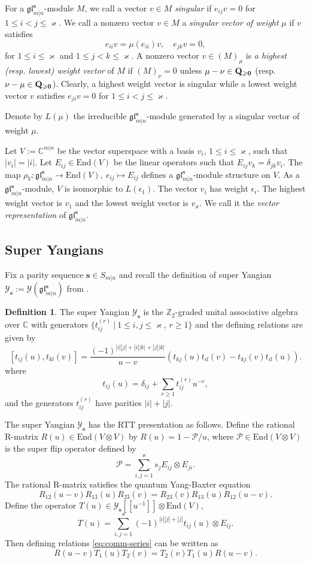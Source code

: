 \documentclass[11pt,reqno]{amsart}
\numberwithin{equation}{section}
\theoremstyle{definition}
\newtheorem{dfn}[thm]{Definition}
\theoremstyle{remark}
\newcommand{\beq}{\begin{equation}}
\newcommand{\eeq}{\end{equation}}
\newcommand{\C}{\mathbb{C}}
\newcommand{\Z}{\mathbb{Z}}
\newcommand{\mc}{\mathcal}
\newcommand{\End}{\mathrm{End}}
\newcommand{\bC}{\mathbb{C}}
\newcommand{\gge}{\geqslant}
\newcommand{\lle}{\leqslant}
\newcommand{\glMN}{\mathfrak{gl}_{m|n}^{\bm s}}
\newcommand{\YglMN}{\mathscr{Y}_{\bm s}}
\newcommand{\ka}{\varkappa}
\newcommand{\s}{{\bm s}}
\begin{document}
For a $\glMN$-module $M$, we call a vector $v\in M$ \textit{singular} if $e_{ij}v=0$ for $1\lle i<j\lle \ka$. We call a nonzero vector $v\in M$ a \textit{singular vector of weight} $\mu$ if $v$ satisfies
\[
e_{ii}v=\mu(e_{ii})v,\quad e_{jk}v=0,
\]
for $1\lle i\lle \ka$ and $1\lle j< k\lle \ka$. A nonzero vector $v\in (M)_{\mu}$ is {\it a highest (resp. lowest) weight vector} of $M$ if $(M)_{\nu}= 0$ unless $\mu-\nu\in\bf Q_{\gge 0}$ (resp. $\nu-\mu\in\bf Q_{\gge 0}$). Clearly, a highest weight vector is singular while a lowest weight vector $v$ satisfies $e_{ji}v=0$ for $1\lle i< j\lle \ka$.


Denote by $L(\mu)$ the irreducible $\glMN$-module generated by a
singular vector of weight $\mu$.


Let $V:=\bC^{m\vert n}$ be the vector superspace with a basis $v_i$, $1\lle i \lle \ka$, such that $\vert v_i\vert =\vert i\vert $. Let $E_{ij}\in\End(V)$ be the linear operators such that $E_{ij}v_k=\delta_{jk}v_i$. The map $\rho_V:\glMN\to \End(V),\ e_{ij}\mapsto E_{ij}$ defines a $\glMN$-module structure on $V$. As a $\glMN$-module, $V$ is isomorphic to $L({\epsilon_1})$. The vector $v_i$ has weight $\epsilon_i$. The highest weight vector is $v_1$ and the lowest weight vector is $v_{\ka}$. We call it the \textit{vector representation} of $\glMN$.

\subsection{Super Yangians}\label{sec rtt}
Fix a parity sequence $\bm s\in S_{m|n}$ and recall the definition of super Yangian $\YglMN:=\mathscr Y(\mathfrak{gl}_{m|n}^\s)$ from \cite{Nazarov1991berezinian}.

\begin{dfn}The super Yangian $\YglMN$ is the $\Z_2$-graded unital associative algebra over $\C$ with generators $\{t_{ij}^{(r)}\ |\ 1\lle i,j \lle\ka, \, r\gge 1\}$ and the defining relations are given by
\beq\label{eq:comm-series}
[t_{ij}(u),t_{kl}(v)]=\frac{(-1)^{|i||j|+|i||k|+|j||k|}}{u-v}(t_{kj}(u)t_{il}(v)-t_{kj}(v)t_{il}(u)).
\eeq
where
\[
t_{ij}(u)=\delta_{ij}+\sum_{r\gge 1}  t_{ij}^{(r)}u^{-r},
\]
and the generators $t_{ij}^{(r)}$ have parities $|i|+|j|$.
\end{dfn}
The super Yangian $\YglMN$ has the RTT presentation as follows. Define the rational R-matrix $R(u)\in \End(V \otimes  V)$ by $R(u)=1-\mathcal P/u$, where $\mc P\in \End(V \otimes V)$ is the super flip operator defined by
\[
\mathcal P=\sum_{i,j=1}^\ka s_jE_{ij}\otimes E_{ji}.
\]
The rational R-matrix satisfies the quantum Yang-Baxter equation
\beq\label{eq yang-baxter}
R_{12}(u-v)R_{13}(u)R_{23}(v)=R_{23}(v)R_{13}(u)R_{12}(u-v).
\eeq
Define the operator $T(u)\in \YglMN[[u^{-1}]]\otimes \End(V) $,
$$
T(u)=\sum_{i,j=1}^\ka (-1)^{|i||j|+|j|} t_{ij}(u)\otimes E_{ij}.
$$
Then defining relations \eqref{eq:comm-series} can be written as
\beq\label{eq:RTT}
R(u-v)T_1(u)T_2(v)=T_2(v)T_1(u)R(u-v).
\eeq
\end{document}
